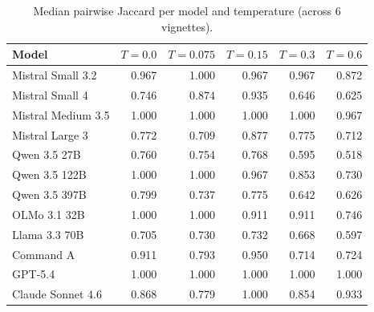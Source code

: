 \begin{table}[H]
  \centering\small
  \begin{tabular}{lrrrrr}
    \toprule
    Model & $T{=}0.0$ & $T{=}0.075$ & $T{=}0.15$ & $T{=}0.3$ & $T{=}0.6$ \\
    \midrule
    Mistral Small 3.2 & 0.967 & 1.000 & 0.967 & 0.967 & 0.872 \\
    Mistral Small 4 & 0.746 & 0.874 & 0.935 & 0.646 & 0.625 \\
    Mistral Medium 3.5 & 1.000 & 1.000 & 1.000 & 1.000 & 0.967 \\
    Mistral Large 3 & 0.772 & 0.709 & 0.877 & 0.775 & 0.712 \\
    Qwen 3.5 27B & 0.760 & 0.754 & 0.768 & 0.595 & 0.518 \\
    Qwen 3.5 122B & 1.000 & 1.000 & 0.967 & 0.853 & 0.730 \\
    Qwen 3.5 397B & 0.799 & 0.737 & 0.775 & 0.642 & 0.626 \\
    OLMo 3.1 32B & 1.000 & 1.000 & 0.911 & 0.911 & 0.746 \\
    Llama 3.3 70B & 0.705 & 0.730 & 0.732 & 0.668 & 0.597 \\
    Command A & 0.911 & 0.793 & 0.950 & 0.714 & 0.724 \\
    GPT-5.4 & 1.000 & 1.000 & 1.000 & 1.000 & 1.000 \\
    Claude Sonnet 4.6 & 0.868 & 0.779 & 1.000 & 0.854 & 0.933 \\
    \bottomrule
  \end{tabular}
  \caption{Median pairwise Jaccard per model and temperature (across 6 vignettes).}
\end{table}

